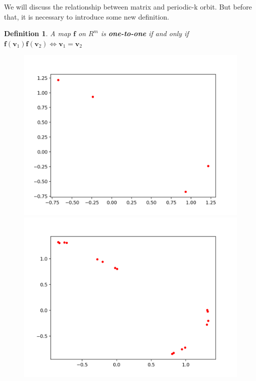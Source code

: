 \documentclass[12pt]{article}
\theoremstyle{plain}
\newtheorem{definition}{{\color{red}\textbf{Definition}}}[section]
\begin{document}
We will discuss the relationship between matrix and periodic-k orbit. But before that, it is necessary to introduce some new definition.

\begin{definition} A map $\mathbf f$ on $R^m$ is \textbf{one-to-one} if and only if $\mathbf f(\mathbf v_1) \mathbf f(\mathbf v_2) \Leftrightarrow \mathbf v_1 = \mathbf v_2$
\end{definition}





\begin{figure}[H]
\begin{minipage}[c][0.32\width]{0.32\textwidth}
   \centering
   \includegraphics[width=\textwidth]{figure/section2/Henon-attractor-0*9-0*4.png}
\end{minipage}
\begin{minipage}[c][0.32\width]{0.32\textwidth}
   \centering
   \includegraphics[width=\textwidth]{figure/section2/Henon-attractor-0*988-0*4.png}

\end{minipage}
\end{figure}
\end{document}
